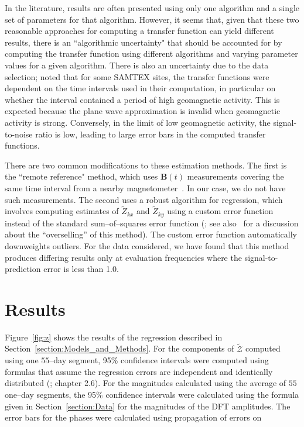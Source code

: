 \documentclass[pdflatex,sn-basic]{sn-jnl}%
\begin{document}
In the literature, results are often presented using only one algorithm and a single set of parameters for that algorithm. However, it seems that, given that these two reasonable approaches for computing a transfer function can yield different results, there is an ``algorithmic uncertainty" that should be accounted for by computing the transfer function using different algorithms and varying parameter values for a given algorithm. There is also an uncertainty due to the data selection; \cite{Chen2022} noted that for some SAMTEX sites, the transfer functions were dependent on the time intervals used in their computation, in particular on whether the interval contained a period of high geomagnetic activity. This is expected because the plane wave approximation is invalid when geomagnetic activity is strong. Conversely, in the limit of low geomagnetic activity, the signal-to-noise ratio is low, leading to large error bars in the computed transfer functions.

There are two common modifications to these estimation methods. The first is the ``remote reference"  method, which uses $\mathbf{B}(t)$ measurements covering the same time interval from a nearby magnetometer~\citep{Simpson2005}. In our case, we do not have such measurements. The second uses a robust algorithm for regression, which involves computing estimates of $\widetilde{Z}_{kx}$ and $\widetilde{Z}_{ky}$ using a custom error function instead of the standard sum--of--squares error function (\cite{Simpson2005}; see also~\cite{Thomson2016} for a discussion about the ``overselling'' of this method). The custom error function automatically downweights outliers. For the data considered, we have found that this method produces differing results only at evaluation frequencies where the signal-to-prediction error is less than 1.0.

\section{Results}
\label{section:Results}

Figure~\ref{fig:z} shows the results of the regression described in Section~\ref{section:Models_and_Methods}. For the components of $\boldsymbol{\mathcal{\widetilde{Z}}}$ computed using one $55$--day segment, 95\% confidence intervals were computed using formulas that assume the regression errors are independent and identically distributed (\cite{Draper1981}; chapter 2.6). For the magnitudes calculated using the average of $55$ one--day segments, the 95\% confidence intervals were calculated using the formula given in Section~\ref{section:Data} for the magnitudes of the DFT amplitudes. The error bars for the phases were calculated using propagation of errors on
\end{document}
